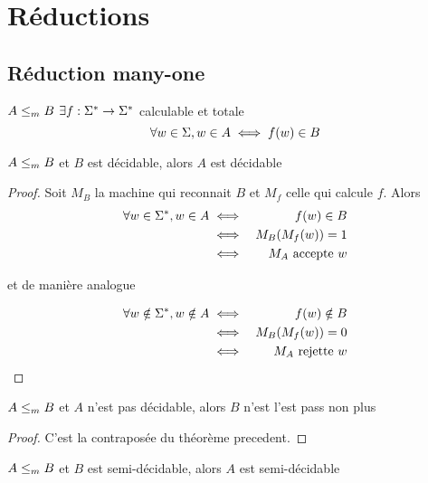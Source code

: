 \section{Réductions}

\subsection{Réduction many-one}

\begin{definition}
	$A \leq_m B$ \ssi $\exists f : \Sigma^{*} \to \Sigma^{*}$ calculable et totale \tlq
	$$\forall w \in \Sigma, w \in A \iff f(w) \in B$$
\end{definition}


\begin{theorem} \label{thm:leqm_dec}
	$A \leq_m B$ et $B$ est décidable, alors $A$ est décidable
\end{theorem}

\begin{proof}

	Soit $M_B$ la machine qui reconnait $B$ et $M_f$ celle qui calcule $f$. Alors
	\begin{eqnarray*}
		\forall w \in \Sigma^{*}, w \in A &\iff& f(w) \in B \\
		&\iff& M_B (M_f (w)) = 1 \\
		&\iff& M_A \text{ accepte } w
	\end{eqnarray*}

	et de manière analogue

	\begin{eqnarray*}
		\forall w \notin \Sigma^{*}, w \notin A &\iff& f(w) \notin B \\
		&\iff& M_B (M_f (w)) = 0 \\
		&\iff& M_A \text{ rejette } w
	\end{eqnarray*}


\end{proof}


\begin{coro}
	$A \leq_m B$ et $A$ n'est pas décidable, alors $B$ n'est l'est pass non plus
\end{coro}

\begin{proof}
	C'est la contraposée du théorème precedent.
\end{proof}

\begin{theorem}
	$A \leq_m B$ et $B$ est semi-décidable, alors $A$ est semi-décidable
\end{theorem}

